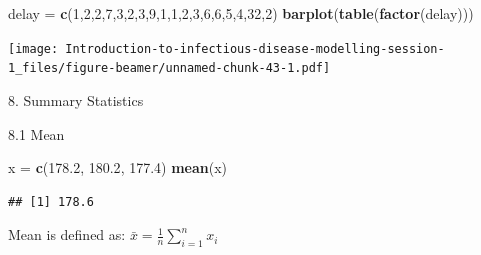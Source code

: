 \documentclass[
  ignorenonframetext,
]{beamer}
\newenvironment{Shaded}{\begin{snugshade}}{\end{snugshade}}
\newcommand{\DecValTok}[1]{\textcolor[rgb]{0.00,0.00,0.81}{#1}}
\newcommand{\FloatTok}[1]{\textcolor[rgb]{0.00,0.00,0.81}{#1}}
\newcommand{\FunctionTok}[1]{\textcolor[rgb]{0.13,0.29,0.53}{\textbf{#1}}}
\newcommand{\NormalTok}[1]{#1}
\newcommand{\OtherTok}[1]{\textcolor[rgb]{0.56,0.35,0.01}{#1}}
\begin{document}
\begin{frame}[fragile]
\begin{Shaded}
\begin{Highlighting}[]
\NormalTok{delay }\OtherTok{=} \FunctionTok{c}\NormalTok{(}\DecValTok{1}\NormalTok{,}\DecValTok{2}\NormalTok{,}\DecValTok{2}\NormalTok{,}\DecValTok{7}\NormalTok{,}\DecValTok{3}\NormalTok{,}\DecValTok{2}\NormalTok{,}\DecValTok{3}\NormalTok{,}\DecValTok{9}\NormalTok{,}\DecValTok{1}\NormalTok{,}\DecValTok{1}\NormalTok{,}\DecValTok{2}\NormalTok{,}\DecValTok{3}\NormalTok{,}\DecValTok{6}\NormalTok{,}\DecValTok{6}\NormalTok{,}\DecValTok{5}\NormalTok{,}\DecValTok{4}\NormalTok{,}\DecValTok{32}\NormalTok{,}\DecValTok{2}\NormalTok{)}
\FunctionTok{barplot}\NormalTok{(}\FunctionTok{table}\NormalTok{(}\FunctionTok{factor}\NormalTok{(delay)))}
\end{Highlighting}
\end{Shaded}

\texttt{[image: Introduction-to-infectious-disease-modelling-session-1\_files/figure-beamer/unnamed-chunk-43-1.pdf]}
\end{frame}

\begin{frame}{8. Summary Statistics}
\protect\hypertarget{summary-statistics}{}
\end{frame}

\begin{frame}[fragile]{8.1 Mean}
\protect\hypertarget{mean}{}
\begin{Shaded}
\begin{Highlighting}[]
\NormalTok{x }\OtherTok{=} \FunctionTok{c}\NormalTok{(}\FloatTok{178.2}\NormalTok{, }\FloatTok{180.2}\NormalTok{, }\FloatTok{177.4}\NormalTok{)}
\FunctionTok{mean}\NormalTok{(x)}
\end{Highlighting}
\end{Shaded}

\begin{verbatim}
## [1] 178.6
\end{verbatim}

Mean is defined as: \(\bar{x} = \frac{1}{n} \sum_{i=1}^{n} x_{i}\)
\end{frame}
\end{document}
